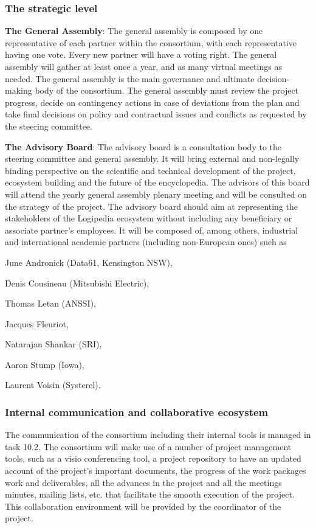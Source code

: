 \subsubsection*{The strategic level}

{\bf The General Assembly}: The general assembly is composed by one
representative of each partner within the consortium, with each
representative having one vote. Every new partner will have a voting
right. The general assembly will gather at least once a year, and as
many virtual meetings as needed. The general assembly is the main
governance and ultimate decision-making body of the consortium. The
general assembly must review the project progress, decide on
contingency actions in case of deviations from the plan and take final
decisions on policy and contractual issues and conflicts as requested
by the steering committee.

{\bf The Advisory Board}: The advisory board is a consultation body to
the steering committee and general assembly. It will bring external
and non-legally binding perspective on the scientific and technical
development of the project, ecosystem building and the future of the
encyclopedia. The advisors of this board will attend the yearly
general assembly plenary meeting and will be consulted on the strategy
of the project. The advisory board should aim at representing the
stakeholders of the Logipedia ecosystem without including any
beneficiary or associate partner’s employees. It will be composed of,
among others, industrial and international academic partners
(including non-European ones) such as
\begin{compactitem}
\item June Andronick (Data61, Kensington NSW), 
\item Denis Cousineau (Mitsubishi Electric), 
\item Thomas Letan (ANSSI), 
\item Jacques Fleuriot, 
\item Natarajan Shankar (SRI),
\item Aaron Stump (Iowa), 
\item Laurent Voisin (Systerel).
\end{compactitem}

 
\subsubsection*{Internal communication and collaborative ecosystem}

The communication of the consortium including their internal tools is
managed in task 10.2.  The consortium will make use of a number of
project management tools, such as a visio conferencing tool, a project
repository to have an updated account of the project’s important
documents, the progress of the work packages work and deliverables,
all the advances in the project and all the meetings minutes, mailing
lists, etc. that facilitate the smooth execution of the project. This
collaboration environment will be provided by the coordinator of the
project.

